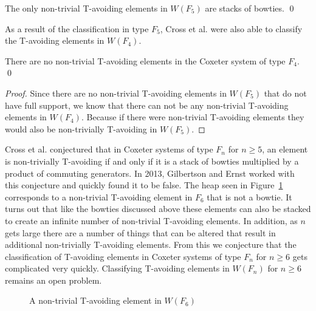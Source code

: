 \begin{theorem}
The only non-trivial T-avoiding elements in $W(F_5)$ are stacks of bowties. \qed	
\end{theorem}


As a result of the classification in type $F_5$, Cross et al. were also able to classify the T-avoiding elements in $W(F_4)$. 

\begin{corollary}
There are no non-trivial T-avoiding elements in the Coxeter system of type $F_4$. \qed	
\begin{proof}
	Since there are no non-trivial T-avoiding elements in $W(F_5)$ that do not have full support, we know that there can not be any non-trivial T-avoiding elements in $W(F_4)$. Because if there were non-trivial T-avoiding elements they would also be non-trivially T-avoiding in $W(F_5)$.
\end{proof}
\end{corollary}

Cross et al. conjectured that in Coxeter systems of type $F_n$ for $n \geq 5$, an element is non-trivially T-avoiding if and only if it is a stack of bowties multiplied by a product of commuting generators. In 2013, Gilbertson and Ernst worked with this conjecture and quickly found it to be false. The heap seen in Figure~\ref{fig:f6bat} corresponds to a non-trivial T-avoiding element in $F_6$ that is not a bowtie. It turns out that like the bowties discussed above these elements can also be stacked to create an infinite number of non-trivial T-avoiding elements. In addition, as $n$ gets large there are a number of things that can be altered that result in additional non-trivially T-avoiding elements. From this we conjecture that the classification of T-avoiding elements in Coxeter systems of type $F_n$ for $n \geq 6$ gets complicated very quickly. Classifying T-avoiding elements in $W(F_n)$ for $n \geq 6$ remains an open problem. 

\begin{figure}[h!]\centering
{}
\caption{A non-trivial T-avoiding element in $W(F_6)$}\label{fig:f6bat}
\end{figure}

